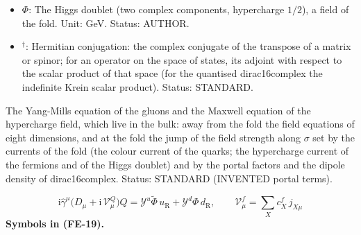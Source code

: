 \documentclass[
  10pt,
]{article}
\begin{document}
\begin{itemize}
  fields of the fold the gauge and spin covariant derivative \(D_\mu\)
  (the partial derivative plus the spin connection of the fold and the
  gauge fields times their couplings and generators);
  \(D^\mu = \hat h^{\mu\nu}D_\nu\); on an adjoint field
  \((D_\mu X)^A = \partial_\mu X^A + g_3f^{ABC}G^B_\mu X^C\) (likewise
  for \(SU(2)\) with \(g_2\epsilon^{IJK}\)). Unit: 1/length. Status:
  STANDARD.
\item
  \(\Phi\): The Higgs doublet (two complex components, hypercharge
  \(1/2\)), a field of the fold. Unit: GeV. Status: AUTHOR.
\item
  \({}^\dagger\): Hermitian conjugation: the complex conjugate of the
  transpose of a matrix or spinor; for an operator on the space of
  states, its adjoint with respect to the scalar product of that space
  (for the quantised dirac16complex the indefinite Krein scalar
  product). Status: STANDARD.
\end{itemize}

The Yang-Mills equation of the gluons and the Maxwell equation of the
hypercharge field, which live in the bulk: away from the fold the field
equations of eight dimensions, and at the fold the jump of the field
strength along \(\sigma\) set by the currents of the fold (the colour
current of the quarks; the hypercharge current of the fermions and of
the Higgs doublet) and by the portal factors and the dipole density of
dirac16complex. Status: STANDARD (INVENTED portal terms).

\[
\mathrm{i}\hat\gamma^\mu\big(D_\mu + \mathrm{i}\,\mathcal{V}^{Q}_\mu\big)Q = \mathcal{Y}^{u}\tilde\Phi\,u_{\mathrm{R}}
 + \mathcal{Y}^{d}\Phi\,d_{\mathrm{R}},\qquad \mathcal{V}^{f}_\mu = \sum_X c^{f}_X\,j_{X\mu} \tag{FE-19}
\] \textbf{Symbols in (FE-19).}
\end{document}
